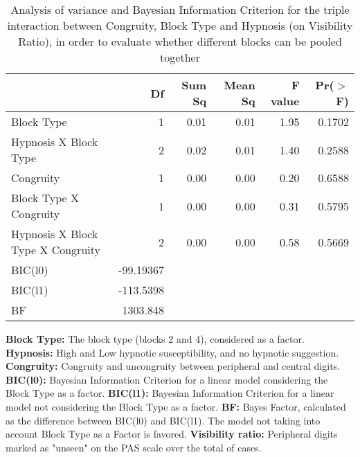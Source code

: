 \documentclass{article}
\begin{document}
\begin{table}
\caption{Analysis of variance and Bayesian Information Criterion for the triple interaction between Congruity, Block Type and Hypnosis (on Visibility Ratio), in order to evaluate whether different blocks can be pooled together}


\centering

\begin{tabular}{lrrrrr}
  \hline
 & Df & Sum Sq & Mean Sq & F value & Pr($>$F) \\ 
  \hline
  Block Type     & 1 & 0.01 & 0.01 & 1.95 & 0.1702 \\ 
  Hypnosis X Block Type & 2 & 0.02 & 0.01 & 1.40 & 0.2588 \\ 
  Congruity     & 1 & 0.00 & 0.00 & 0.20 & 0.6588 \\ 
  Block Type X Congruity     & 1 & 0.00 & 0.00 & 0.31 & 0.5795 \\ 
  Hypnosis X Block Type X Congruity & 2 & 0.00 & 0.00 & 0.58 & 0.5669 \\ 
  BIC(l0) & -99.19367\\
  BIC(l1) & -113.5398\\
  BF & 1303.848\\
   \hline
\end{tabular}

\end{table}

\textbf{Block Type:} The block type (blocks 2 and 4), considered as a factor. \textbf{Hypnosis:} High and Low hypnotic susceptibility, and no hypnotic suggestion. \textbf{Congruity:} Congruity and uncongruity between peripheral and central digits. \textbf{BIC(l0):} Bayesian Information Criterion for a linear model considering the Block Type as a factor. \textbf{BIC(l1):} Bayesian Information Criterion for a linear model not considering the Block Type as a factor. \textbf{BF:} Bayes Factor, calculated as the difference between BIC(l0) and BIC(l1). The model not taking into account Block Type as a Factor is favored. \textbf{Visibility ratio:} Peripheral digits marked as "unseen" on the PAS scale over the total of cases. 
\end{document}

